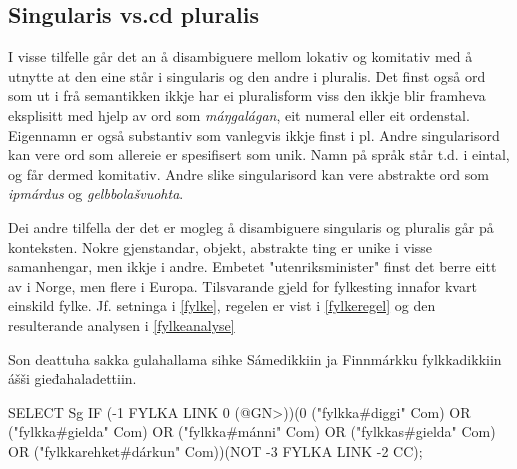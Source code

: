 \documentclass[a4paper,norsk]{article}
\begin{document}
\subsection{Singularis vs.cd pluralis}

I visse tilfelle  går det an å disambiguere mellom lokativ og komitativ med å utnytte at den eine står i singularis og den andre i pluralis. %
Det finst også ord som ut i frå semantikken ikkje har ei pluralisform viss den ikkje blir framheva eksplisitt med hjelp av ord som \textit{máŋgalágan}, eit numeral eller eit ordenstal. Eigennamn er også substantiv som vanlegvis ikkje finst i pl. Andre singularisord kan vere ord som allereie er spesifisert som unik. Namn på språk står t.d. i eintal, og får dermed komitativ. Andre slike singularisord kan vere abstrakte ord som \emph{ipmárdus} og \emph{gelbbolašvuohta}. %

Dei andre tilfella der det er mogleg å disambiguere singularis og pluralis går på konteksten. Nokre gjenstandar, objekt, abstrakte ting er unike i visse samanhengar, men ikkje i andre. Embetet "utenriksminister" finst det berre eitt av i Norge, men flere i Europa. Tilsvarande gjeld for fylkesting innafor kvart einskild fylke. Jf. setninga i \ref{fylke}, regelen er vist i \ref{fylkeregel} og den resulterande analysen i \ref{fylkeanalyse} %

\begin{example}\label{fylke}
Son deattuha sakka gulahallama sihke Sámedikkiin ja Finnmárkku fylkkadikkiin ášši gieđahaladettiin.
\end{example}

\begin{example}\label{fylkeregel}
SELECT Sg IF (-1 FYLKA LINK 0 (@GN>))(0 ("fylkka\#diggi" Com) OR ("fylkka\#gielda" Com) OR ("fylkka\#mánni" Com) OR ("fylkkas\#gielda" Com) OR ("fylkkarehket\#dárkun" Com))(NOT -3 FYLKA LINK -2 CC);
\end{example}
\end{document}
